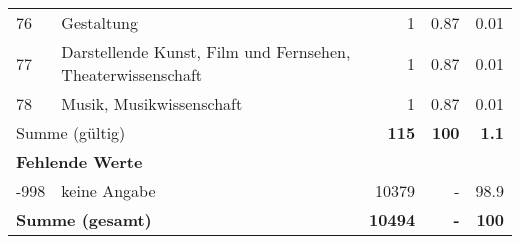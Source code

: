 \begin{longtable}{lXrrr}
        76 & \multicolumn{1}{X}{Gestaltung} & %
          \num{1} &
          \num[round-mode=places,round-precision=2]{0.87} &
          \num[round-mode=places,round-precision=2]{0.01} \\

        77 & \multicolumn{1}{X}{Darstellende Kunst, Film und Fernsehen, Theaterwissenschaft} & %
          \num{1} &
          \num[round-mode=places,round-precision=2]{0.87} &
          \num[round-mode=places,round-precision=2]{0.01} \\

        78 & \multicolumn{1}{X}{Musik, Musikwissenschaft} & %
          \num{1} &
          \num[round-mode=places,round-precision=2]{0.87} &
          \num[round-mode=places,round-precision=2]{0.01} \\

     \midrule
     \multicolumn{2}{l}{Summe (gültig)} &
       \textbf{\num{115}} &
     \textbf{\num{100}} &
       \textbf{\num[round-mode=places,round-precision=2]{1.1}} \\
     \multicolumn{5}{l}{\textbf{Fehlende Werte}}\\
       -998 &
       keine Angabe &
         \num{10379} &
        - &
         \num[round-mode=places,round-precision=2]{98.9} \\
     \midrule
     \multicolumn{2}{l}{\textbf{Summe (gesamt)}} &
          \textbf{\num{10494}} &
        \textbf{-} &
        \textbf{\num{100}} \\
     \bottomrule
     \end{longtable}
     
